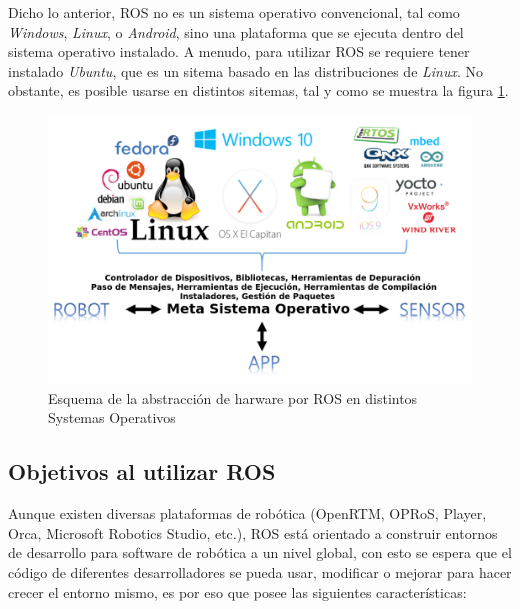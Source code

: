Dicho lo anterior, ROS no es un sistema operativo convencional, tal como \textit{Windows}, \textit{Linux}, o \textit{Android}, sino una plataforma que se ejecuta dentro del sistema operativo instalado. A menudo, para utilizar ROS se requiere tener instalado \textit{Ubuntu}, que es un sitema basado en las distribuciones de \textit{Linux}. No obstante, es posible usarse en distintos sitemas, tal y como se muestra la figura \ref{fig:meta_operating_system}. 
\begin{figure}
\centering
\includegraphics[scale=0.5]{images/meta_operating_system.png}
\caption{Esquema de la abstracción de harware por ROS en distintos Systemas Operativos}
\label{fig:meta_operating_system}
\end{figure} 

		\subsection*{Objetivos al utilizar ROS}
Aunque existen diversas plataformas de robótica (OpenRTM, OPRoS, Player, Orca, Microsoft Robotics Studio, etc.), ROS está orientado a construir entornos de desarrollo para software de robótica a un nivel global, con esto se espera que el código de diferentes desarrolladores se pueda usar, modificar o mejorar para hacer crecer el entorno mismo, es por eso que posee las siguientes características:

